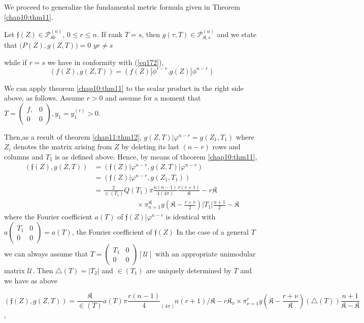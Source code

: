 We proceed to generalize the fundamental metric formula given in
Theorem \ref{chap10:thm11}. 

Let $\mathfrak{f}(Z)\in \mathscr{P}_{\mathfrak{K}r}^{(n)}$, $0 \leq r
\leq n$. If rank $T=s$, then $g(\tau, T)\in
\mathscr{P}^{(n)}_{\mathfrak{K}, s}$ and we state that $\big(P(Z), g(Z,
T) \big)=0$   $y r  \neq s$ 

\noindent
while if $r=s$ we have in conformity with (\ref{eq172}),
$$
(f(Z), g(Z, T))= (f(Z)|\phi^{r-r}.g(Z)| \phi ^{n-r})
$$

We can apply theorem \ref{chap10:thm11} to the scalar product in the right side
above, as follows. 
Assume $r >0$ and assume for a moment that $T= \begin{pmatrix}f, & 0
  \\ 0 & 0 \end{pmatrix}, y_1=y_1^{(r)}>0$. 

Then,\pageoriginale as a result of theorem \ref{chap11:thm12}, $g(Z,
T)|\varphi^{n-r}=g(Z_1, T_1)$ 
where $Z_i$ denotes the matrix arising from $Z$ by deleting its last
$(n-r)$ rows and columns and $T_1$ is as defined above. Hence, by means
of theorem \ref{chap10:thm11}, 
\begin{align*}
 (\mathfrak{f}(Z), g(Z, T)) &= (\mathfrak{f}(Z)|\varphi^{n-r}, g(Z,
  T)|\varphi^{n-r})\\ 
 &=(\mathfrak{f}(Z)|\varphi^{n-r}, g(Z_1, T_1))\\
 &=\frac{2}{\in(T_1)} Q(T_1) \pi \frac{n(n-1)}{4  (4 \pi)}
  \frac{r(r+1)}{\mathfrak{K}}-r\mathfrak{K} \\
& \qquad \qquad \qquad \times \pi^{\mathfrak{K}}_{n=1}y
  (\mathfrak{K}-\frac{r+\nu}{2})|T_1|\frac{n+1}{2}-\mathfrak{K} 
 \end{align*}
  where the Fourier coefficient $a(T)$ of
  $\mathfrak{f}(Z)|\varphi^{n-r}$ is identical with\break
  $a \begin{pmatrix}T_1 & 0 \\ 0 & 0\end{pmatrix}=a(T)$, the Fourier
    coefficient of $\mathfrak{f}(Z)$ In the case of a general $T$ we
    can always assume that $T=\begin{pmatrix}T_1 & 0 \\ 0 &
    0 \end{pmatrix}[\mathcal{U}]$ with an appropriate unimodular
    matrix $\mathcal{U}$. Then $\triangle(T)=|T_2|$ and $\in (T_1)$
    are uniquely determined by $T$ and we have as above 
  
  $(\mathfrak{f}(Z), g(Z, T))= \dfrac{\mathfrak{K}}{\in (T)}a(T)\pi
    \dfrac{r(n-1)}{4} \underset{(4 \pi)}{} n(r+1)/\mathfrak{K}-r\mathfrak{K}_x
    \times \pi_{\nu=1}^{r} y
    (\mathfrak{K}-\dfrac{r+\nu}{\mathfrak{K}})(\triangle (T))
    \dfrac{n+1}{\mathfrak{K}-\mathfrak{K}}$, 
  
